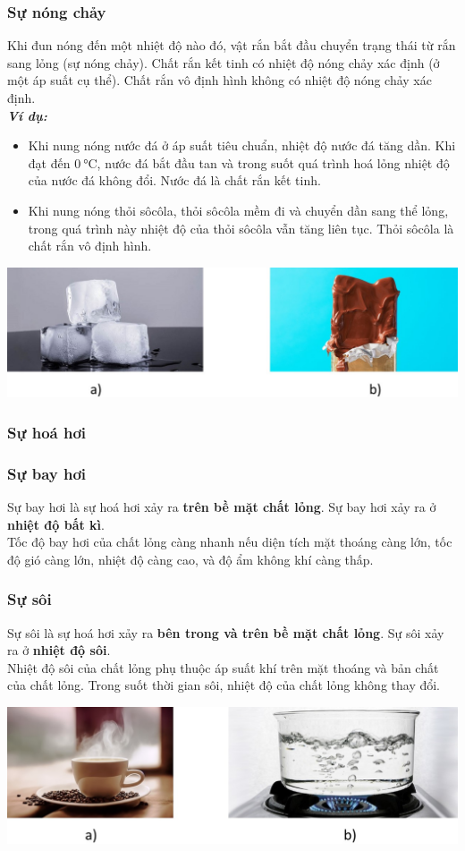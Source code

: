 \subsubsection{Sự nóng chảy}
Khi đun nóng đến một nhiệt độ nào đó, vật rắn bắt đầu chuyển trạng thái từ rắn sang lỏng (sự nóng chảy). Chất rắn kết tinh có nhiệt độ nóng chảy xác định (ở một áp suất cụ thể). Chất rắn vô định hình không có nhiệt độ nóng chảy xác định.\\
\textbf{\textit{Ví dụ:}}
\begin{itemize}
	\item Khi nung nóng nước đá ở áp suất tiêu chuẩn, nhiệt độ nước đá tăng dần. Khi đạt đến $\SI{0}{\celsius}$, nước đá bắt đầu tan và trong suốt quá trình hoá lỏng nhiệt độ của nước đá không đổi. Nước đá là chất rắn kết tinh.
	\item Khi nung nóng thỏi sôcôla, thỏi sôcôla mềm đi và chuyển dần sang thể lỏng, trong quá trình này nhiệt độ của thỏi sôcôla vẫn tăng liên tục. Thỏi sôcôla là chất rắn vô định hình.
\end{itemize}
\begin{center}
	\includegraphics[width=0.6\linewidth]{figs/VN12-Y24-PH-SYL-001-5}
\end{center}
\subsubsection{Sự hoá hơi}
\subsubsection{Sự bay hơi}
Sự bay hơi là sự hoá hơi xảy ra \textbf{trên bề mặt chất lỏng}. Sự bay hơi xảy ra ở \textbf{nhiệt độ bất kì}.\\
Tốc độ bay hơi của chất lỏng càng nhanh nếu diện tích mặt thoáng càng lớn, tốc độ gió càng lớn, nhiệt độ càng cao, và độ ẩm không khí càng thấp.
\subsubsection{Sự sôi}
Sự sôi là sự hoá hơi xảy ra \textbf{bên trong và trên bề mặt chất lỏng}. Sự sôi xảy ra ở \textbf{nhiệt độ sôi}.\\
Nhiệt độ sôi của chất lỏng phụ thuộc áp suất khí trên mặt thoáng và bản chất của chất lỏng. Trong suốt thời gian sôi, nhiệt độ của chất lỏng không thay đổi.
\begin{center}
	
	\includegraphics[width=0.65\linewidth]{figs/VN12-Y24-PH-SYL-001-6}
\end{center}
